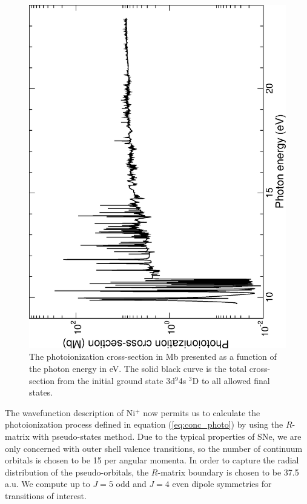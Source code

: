 %
\begin{figure}[h]
\centering
\includegraphics[scale=0.5,angle=-90]{Figures/Conclusions/ni_rmps_excited.eps}
\caption{The photoionization cross-section in Mb presented as a function of the photon energy in eV. The solid black curve is the total cross-section from the initial ground state 3d$^9$4s $^3$D to all allowed final states. \label{fig:con_excited}}
\end{figure}
%

The wavefunction description of Ni$^+$ now permits us to calculate the photoionization process defined in equation (\ref{eq:conc_photo}) by using the $R$-matrix with pseudo-states method. Due to the typical properties of SNe, we are only concerned with outer shell valence transitions, so the number of continuum orbitals is chosen to be 15 per angular momenta. In order to capture the radial distribution of the pseudo-orbitals, the $R$-matrix boundary is chosen to be 37.5 a.u. We compute up to $J=5$ odd and $J=4$ even dipole symmetries for transitions of interest.  

